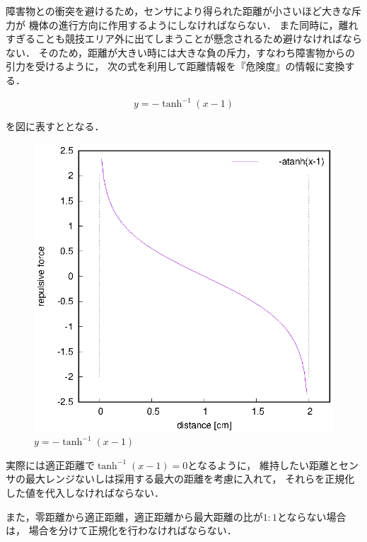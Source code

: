 \documentclass[11pt,a4paper]{jsarticle}
\begin{document}
  障害物との衝突を避けるため，センサにより得られた距離が小さいほど大きな斥力が
  機体の進行方向に作用するようにしなければならない．
  また同時に，離れすぎることも競技エリア外に出てしまうことが懸念されるため避けなければならない．
  そのため，距離が大きい時には大きな負の斥力，すなわち障害物からの引力を受けるように，
  次の式を利用して距離情報を『危険度』の情報に変換する．

  \begin{equation}
    y = -\tanh^{-1}(x-1) \label{eq::arctanh}
  \end{equation}

  を図に表すととなる．

  \begin{figure}[b]
    \begin{center}
      \includegraphics[width=1.0\hsize]{plot/minus_atanh.eps}
    \end{center}
    \caption{$y=-\tanh^{-1}(x-1)$}
    \label{fig::arctanh}
  \end{figure}

  実際には適正距離で$\tanh^{-1}(x-1) = 0$となるように，
  維持したい距離とセンサの最大レンジないしは採用する最大の距離を考慮に入れて，
  それらを正規化した値を代入しなければならない．

  また，零距離から適正距離，適正距離から最大距離の比が$1:1$とならない場合は，
  場合を分けて正規化を行わなければならない．\\
\end{document}
